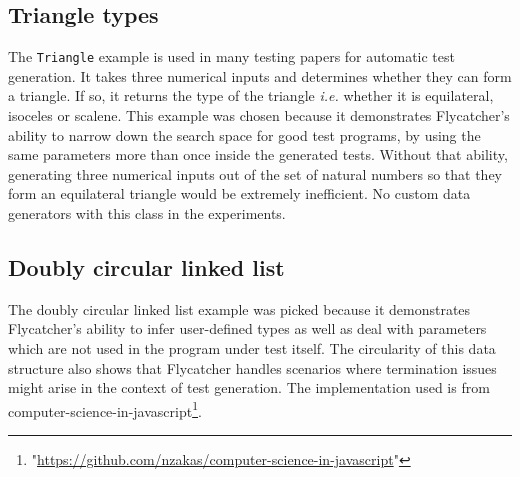 
\subsection{Triangle types}
The \texttt{Triangle} example is used in many testing papers for automatic test generation. It takes three numerical inputs and determines whether they can form a triangle. If so, it returns the type of the triangle \emph{i.e.} whether it is equilateral, isoceles or scalene. This example was chosen because it demonstrates \textsf{Flycatcher}'s ability to narrow down the search space for good test programs, by using the same parameters more than once inside the generated tests. Without that ability, generating three numerical inputs out of the set of natural numbers so that they form an equilateral triangle would be extremely inefficient. No custom data generators with this class in the experiments.

\subsection{Doubly circular linked list}
The doubly circular linked list example was picked because it demonstrates \textsf{Flycatcher}'s ability to infer user-defined types as well as deal with parameters which are not used in the program under test itself. The circularity of this data structure also shows that \textsf{Flycatcher} handles scenarios where termination issues might arise in the context of test generation. The implementation used is from \textsf{computer-science-in-javascript}\footnote{"\url{https://github.com/nzakas/computer-science-in-javascript}"}.

